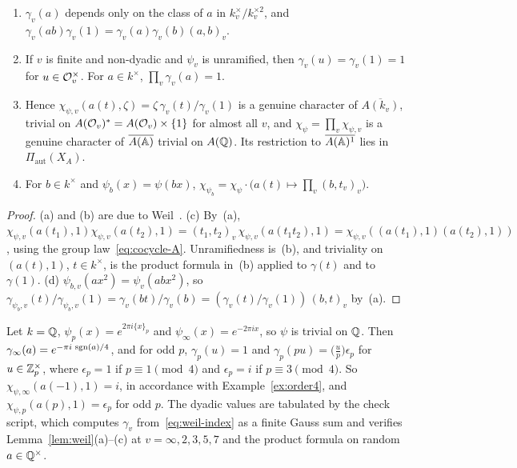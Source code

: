 \begin{lemma}\label{lem:weil}
\begin{enumerate}[label=(\alph*)]
\item $\gamma_v(a)$ depends only on the class of $a$ in
  $k_v^\times/k_v^{\times2}$, and
  $\gamma_v(ab)\gamma_v(1)=\gamma_v(a)\gamma_v(b)(a,b)_v$.
\item If $v$ is finite and non-dyadic and $\psi_v$ is unramified, then
  $\gamma_v(u)=\gamma_v(1)=1$ for $u\in\mathcal{O}_v^\times$. For $a\in k^\times$,
  $\prod_v\gamma_v(a)=1$.
\item Hence $\chi_{\psi,v}(a(t),\zeta)=\zeta\,\gamma_v(t)/\gamma_v(1)$ is
  a genuine character of $\overline{A(k_v)}$, trivial on $A(\mathcal{O}_v)^*=
  A(\mathcal{O}_v)\times\{1\}$ for almost all $v$, and
  $\chi_\psi=\prod_v\chi_{\psi,v}$ is a genuine character of
  $\overline{A(\mathbb{A})}$ trivial on $A(\mathbb{Q})$. Its restriction to
  $\overline{A(\mathbb{A})^1}$ lies in $\Pi_{\mathrm{aut}}(X_A)$.
\item For $b\in k^\times$ and $\psi_b(x)=\psi(bx)$,
  $\chi_{\psi_b}=\chi_\psi\cdot\bigl(a(t)\mapsto\prod_v(b,t_v)_v\bigr)$.
\end{enumerate}
\end{lemma}

\begin{proof}
(a) and (b) are due to Weil~\cite[\S\S14, 28]{We64}. (c) By~(a),
$\chi_{\psi,v}(a(t_1),1)\chi_{\psi,v}(a(t_2),1)=(t_1,t_2)_v\,
\chi_{\psi,v}(a(t_1t_2),1)=\chi_{\psi,v}((a(t_1),1)(a(t_2),1))$, using the
group law~\eqref{eq:cocycle-A}. Unramifiedness is~(b), and triviality on
$(a(t),1)$, $t\in k^\times$, is the product formula in~(b) applied to
$\gamma(t)$ and to $\gamma(1)$. (d) $\psi_{b,v}(ax^2)=\psi_v(abx^2)$, so
$\gamma_{\psi_b,v}(t)/\gamma_{\psi_b,v}(1)=\gamma_v(bt)/\gamma_v(b)=
(\gamma_v(t)/\gamma_v(1))\,(b,t)_v$ by~(a).
\end{proof}

\begin{example}\label{ex:weil-Q}
Let $k=\mathbb{Q}$, $\psi_p(x)=e^{2\pi i\{x\}_p}$ and $\psi_\infty(x)=
e^{-2\pi ix}$, so $\psi$ is trivial on $\mathbb{Q}$. Then
$\gamma_\infty(a)=e^{-\pi i\,\operatorname{sgn}(a)/4}$, and for odd $p$,
$\gamma_p(u)=1$ and $\gamma_p(pu)=\bigl(\tfrac up\bigr)\epsilon_p$ for
$u\in\mathbb{Z}_p^\times$, where $\epsilon_p=1$ if $p\equiv1\pmod4$ and
$\epsilon_p=i$ if $p\equiv3\pmod4$. So
$\chi_{\psi,\infty}(a(-1),1)=i$, in accordance with
Example~\ref{ex:order4}, and $\chi_{\psi,p}(a(p),1)=\epsilon_p$ for odd
$p$. The dyadic values are tabulated by the check script, which computes
$\gamma_v$ from~\eqref{eq:weil-index} as a finite Gauss sum and verifies
Lemma~\ref{lem:weil}(a)--(c) at $v=\infty,2,3,5,7$ and the product
formula on random $a\in\mathbb{Q}^\times$.
\end{example}

